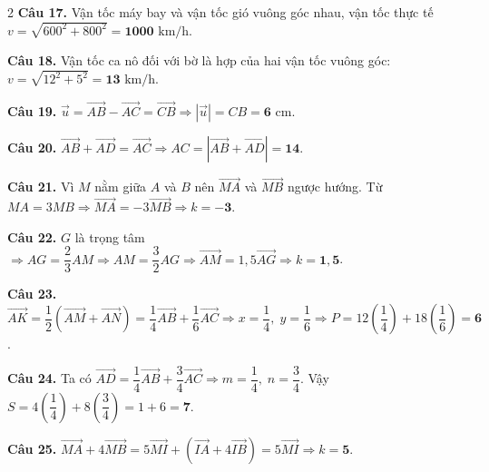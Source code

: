 \documentclass[12pt,a4paper]{article}
\begin{document}
\begin{multicols}{2}
\textbf{Câu 17.} Vận tốc máy bay và vận tốc gió vuông góc nhau, vận tốc thực tế $v = \sqrt{600^2 + 800^2} = \mathbf{1000}\text{ km/h}$.\par\vspace{2.5pt}

\textbf{Câu 18.} Vận tốc ca nô đối với bờ là hợp của hai vận tốc vuông góc: $v = \sqrt{12^2 + 5^2} = \mathbf{13}\text{ km/h}$.\par\vspace{2.5pt}

\textbf{Câu 19.} $\vec{u} = \vec{AB} - \vec{AC} = \vec{CB} \Rightarrow |\vec{u}| = CB = \mathbf{6}\text{ cm}$.\par\vspace{2.5pt}

\textbf{Câu 20.} $\vec{AB} + \vec{AD} = \vec{AC} \Rightarrow AC = |\vec{AB} + \vec{AD}| = \mathbf{14}$.\par\vspace{2.5pt}

\textbf{Câu 21.} Vì $M$ nằm giữa $A$ và $B$ nên $\vec{MA}$ và $\vec{MB}$ ngược hướng. Từ $MA = 3MB \Rightarrow \vec{MA} = -3\vec{MB} \Rightarrow k = \mathbf{-3}$.\par\vspace{2.5pt}

\textbf{Câu 22.} $G$ là trọng tâm $\Rightarrow AG = \dfrac{2}{3}AM \Rightarrow AM = \dfrac{3}{2}AG \Rightarrow \vec{AM} = 1{,}5\vec{AG} \Rightarrow k = \mathbf{1{,}5}$.\par\vspace{2.5pt}

\textbf{Câu 23.} $\vec{AK} = \dfrac{1}{2}(\vec{AM} + \vec{AN}) = \dfrac{1}{4}\vec{AB} + \dfrac{1}{6}\vec{AC} \Rightarrow x = \dfrac{1}{4},\; y = \dfrac{1}{6} \Rightarrow P = 12\left(\dfrac{1}{4}\right) + 18\left(\dfrac{1}{6}\right) = \mathbf{6}$.\par\vspace{2.5pt}

\textbf{Câu 24.} Ta có $\vec{AD} = \dfrac{1}{4}\vec{AB} + \dfrac{3}{4}\vec{AC} \Rightarrow m = \dfrac{1}{4},\; n = \dfrac{3}{4}$. Vậy $S = 4\left(\dfrac{1}{4}\right) + 8\left(\dfrac{3}{4}\right) = 1 + 6 = \mathbf{7}$.\par\vspace{2.5pt}

\textbf{Câu 25.} $\vec{MA} + 4\vec{MB} = 5\vec{MI} + (\vec{IA} + 4\vec{IB}) = 5\vec{MI} \Rightarrow k = \mathbf{5}$.\par\vspace{2.5pt}


\end{multicols}
\end{document}
